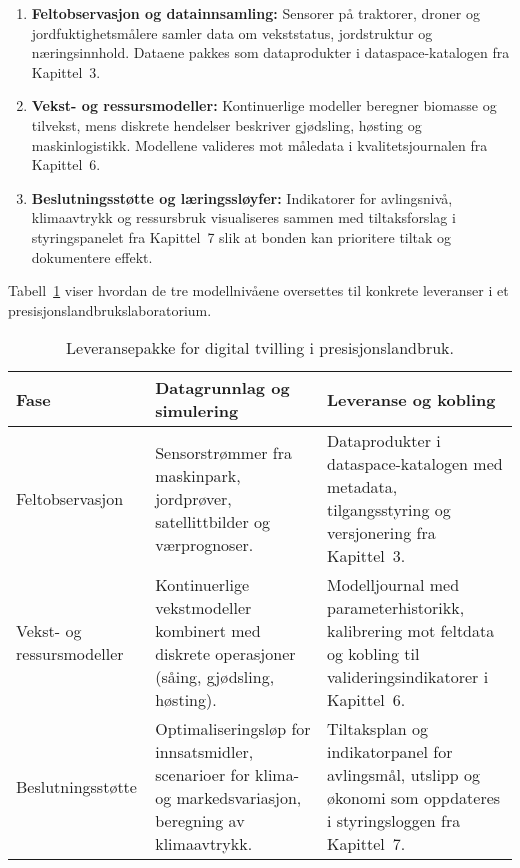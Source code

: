 \begin{enumerate}
    \item \textbf{Feltobservasjon og datainnsamling:} Sensorer på traktorer, droner og jordfuktighetsmålere samler data om vekststatus, jordstruktur og næringsinnhold. Dataene pakkes som dataprodukter i dataspace-katalogen fra Kapittel~3.
    \item \textbf{Vekst- og ressursmodeller:} Kontinuerlige modeller beregner biomasse og tilvekst, mens diskrete hendelser beskriver gjødsling, høsting og maskinlogistikk. Modellene valideres mot måledata i kvalitetsjournalen fra Kapittel~6.
    \item \textbf{Beslutningsstøtte og læringssløyfer:} Indikatorer for avlingsnivå, klimaavtrykk og ressursbruk visualiseres sammen med tiltaksforslag i styringspanelet fra Kapittel~7 slik at bonden kan prioritere tiltak og dokumentere effekt.
\end{enumerate}

Tabell~\ref{tab:kap04-presisjonslandbruk} viser hvordan de tre modellnivåene oversettes til konkrete leveranser i et presisjonslandbrukslaboratorium.

\begin{table}[htbp]
    \centering
    \caption{Leveransepakke for digital tvilling i presisjonslandbruk.}
    \label{tab:kap04-presisjonslandbruk}
    \begin{tabular}{p{}p{}p{}}
        \toprule
        \textbf{Fase} & \textbf{Datagrunnlag og simulering} & \textbf{Leveranse og kobling} \\
        \midrule
        Feltobservasjon & Sensorstrømmer fra maskinpark, jordprøver, satellittbilder og værprognoser. & Dataprodukter i dataspace-katalogen med metadata, tilgangsstyring og versjonering fra Kapittel~3. \\
        \addlinespace
        Vekst- og ressursmodeller & Kontinuerlige vekstmodeller kombinert med diskrete operasjoner (såing, gjødsling, høsting). & Modelljournal med parameterhistorikk, kalibrering mot feltdata og kobling til valideringsindikatorer i Kapittel~6. \\
        \addlinespace
        Beslutningsstøtte & Optimaliseringsløp for innsatsmidler, scenarioer for klima- og markedsvariasjon, beregning av klimaavtrykk. & Tiltaksplan og indikatorpanel for avlingsmål, utslipp og økonomi som oppdateres i styringsloggen fra Kapittel~7. \\
        \bottomrule
    \end{tabular}
\end{table}


